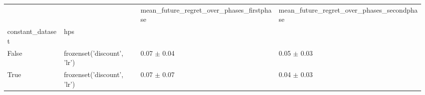 \begin{tabular}{llll}
\toprule
 &  & mean_future_regret_over_phases_firstphase & mean_future_regret_over_phases_secondphase \\
constant_dataset & hps &  &  \\
\midrule
False & frozenset({'discount', 'lr'}) & 0.07 $\pm$ 0.04 & 0.05 $\pm$ 0.03 \\
\cline{1-4}
True & frozenset({'discount', 'lr'}) & 0.07 $\pm$ 0.07 & 0.04 $\pm$ 0.03 \\
\cline{1-4}
\bottomrule
\end{tabular}
